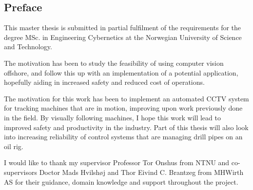 \subsection*{Preface}
This master thesis is submitted in partial fulfilment of the requirements for the degree MSc. in Engineering Cybernetics at the Norwegian University of Science and Technology.

The motivation has been to study the feasibility of using computer vision offshore, and follow this up with an implementation of a potential application, hopefully aiding in increased safety and reduced cost of operations.

The motivation for this work has been to implement an automated CCTV system for tracking machines that are in motion, improving upon work previously done in the field. By visually following machines, I hope this work will lead to improved safety and productivity in the industry. Part of this thesis will also look into increasing reliability of control systems that are managing drill pipes on an oil rig.

I would like to thank my supervisor Professor Tor Onshus from NTNU and co-supervisors Doctor Mads Hvilshøj and Thor Eivind C. Brantzeg from MHWirth AS for their guidance, domain knowledge and support throughout the project.

\newpage
